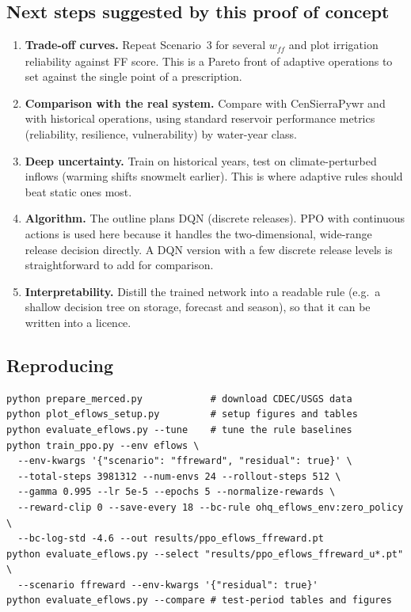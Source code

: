 \documentclass[11pt]{article}
\begin{document}
\subsection*{Next steps suggested by this proof of concept}
\begin{enumerate}
\item \textbf{Trade-off curves.} Repeat Scenario~3 for several $w_{\mathit{ff}}$
  and plot irrigation reliability against FF score. This is a Pareto front
  of adaptive operations to set against the single point of a prescription.
\item \textbf{Comparison with the real system.} Compare with
  CenSierraPywr and with historical operations, using standard reservoir
  performance metrics (reliability, resilience, vulnerability) by
  water-year class.
\item \textbf{Deep uncertainty.} Train on historical years, test on
  climate-perturbed inflows (warming shifts snowmelt earlier). This is
  where adaptive rules should beat static ones most.
\item \textbf{Algorithm.} The outline plans DQN (discrete releases). PPO with
  continuous actions is used here because it handles the two-dimensional,
  wide-range release decision directly. A DQN version with a few discrete
  release levels is straightforward to add for comparison.
\item \textbf{Interpretability.} Distill the trained network into a
  readable rule (e.g.\ a shallow decision tree on storage, forecast and
  season), so that it can be written into a licence.
\end{enumerate}

\subsection*{Reproducing}
\begin{verbatim}
python prepare_merced.py            # download CDEC/USGS data
python plot_eflows_setup.py         # setup figures and tables
python evaluate_eflows.py --tune    # tune the rule baselines
python train_ppo.py --env eflows \
  --env-kwargs '{"scenario": "ffreward", "residual": true}' \
  --total-steps 3981312 --num-envs 24 --rollout-steps 512 \
  --gamma 0.995 --lr 5e-5 --epochs 5 --normalize-rewards \
  --reward-clip 0 --save-every 18 --bc-rule ohq_eflows_env:zero_policy \
  --bc-log-std -4.6 --out results/ppo_eflows_ffreward.pt
python evaluate_eflows.py --select "results/ppo_eflows_ffreward_u*.pt" \
  --scenario ffreward --env-kwargs '{"residual": true}'
python evaluate_eflows.py --compare # test-period tables and figures
\end{verbatim}
\end{document}
